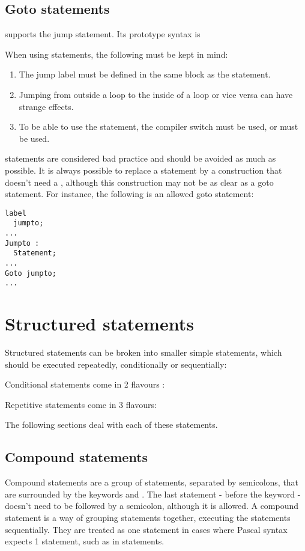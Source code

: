 \subsection{Goto statements}
\fpc supports the  jump statement. Its prototype syntax is

When using  statements, the following must be kept in mind:
\begin{enumerate}
\item The jump label must be defined in the same block as the 
statement.
\item Jumping from outside a loop to the inside of a loop or vice versa can
 have strange effects.
\item To be able to use the  statement, the  compiler
switch must be used, or  must be used.
\end{enumerate}
 statements are considered bad practice and should be avoided as
much as possible. It is always possible to replace a  statement by a
construction that doesn't need a , although this construction may
not be as clear as a goto statement.
For instance, the following is an allowed goto statement:
\begin{verbatim}
label
  jumpto;
...
Jumpto :
  Statement;
...
Goto jumpto;
...
\end{verbatim}

\section{Structured statements}
Structured statements can be broken into smaller simple statements, which
should be executed repeatedly, conditionally  or sequentially:

Conditional statements come in 2 flavours :

Repetitive statements come in 3 flavours:

The following sections deal with each of these statements.

\subsection{Compound statements}
Compound statements are a group of statements, separated by semicolons,
that are surrounded by the keywords  and . The
last statement - before the  keyword - doesn't need to be followed by a semicolon, although it is
allowed. A compound statement is a way of grouping statements together,
executing the statements sequentially. They are treated as one statement
in cases where Pascal syntax expects 1 statement, such as in
 statements.


